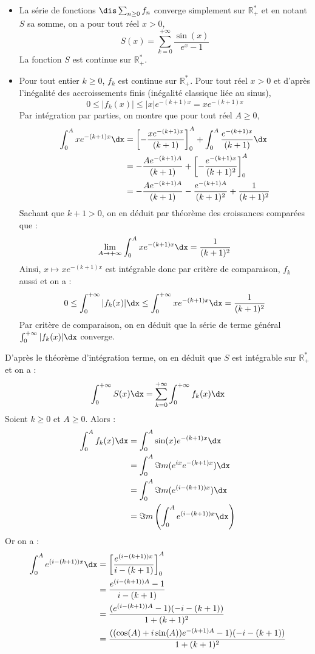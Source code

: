 \documentclass[a4paper,10pt]{report}
\begin{document}
\begin{itemize}
\item La série de fonctions $\dis \sum_{n \geq 0} f_n$ converge simplement sur $\mathbb{R}_+^*$ et en notant $S$ sa somme, on a pour tout réel $x>0$,
$$ S(x)= \sum_{k=0}^{+ \infty} \dfrac{\sin(x)}{e^x-1}$$
La fonction $S$ est continue sur $\mathbb{R}_+^*$.
\item Pour tout entier $k \geq 0$, $f_k$ est continue sur $\mathbb{R}_+^*$. Pour tout réel $x>0$ et d'après l'inégalité des accroissements finis (inégalité classique liée au sinus),
$$ 0 \leq \vert f_k(x) \vert \leq \vert x \vert e^{-(k+1)x} = x  e^{-(k+1)x}$$
Par intégration par parties, on montre que pour tout réel $A \geq 0$,
\begin{align*}
\int_0^{A} x e^{-(k+1)x} \dx & = \left[- \dfrac{xe^{-(k+1)x}}{(k+1)} \right]_0^A + \int_0^A \dfrac{e^{-(k+1)x}}{(k+1)} \dx \\
& = - \dfrac{Ae^{-(k+1)A}}{(k+1)} +  \left[- \dfrac{e^{-(k+1)x}}{(k+1)^2} \right]_0^A \\
& =  - \dfrac{Ae^{-(k+1)A}}{(k+1)} - \dfrac{e^{-(k+1)A}}{(k+1)^2} + \dfrac{1}{(k+1)^2}
\end{align*}
Sachant que $k+1>0$, on en déduit par théorème des croissances comparées que :
$$ \lim_{A \rightarrow + \infty} \int_0^{A} x e^{-(k+1)x} \dx = \dfrac{1}{(k+1)^2}$$
Ainsi, $x \mapsto x  e^{-(k+1)x}$ est intégrable donc par critère de comparaison, $f_k$ aussi et on a :
$$ 0 \leq \int_0^{+ \infty}\vert f_k(x) \vert \dx \leq  \int_0^{+ \infty} x  e^{-(k+1)x} \dx = \dfrac{1}{(k+1)^2}$$
Par critère de comparaison, on en déduit que la série de terme général $\int_0^{+ \infty}\vert f_k(x) \vert \dx$ converge.
\end{itemize}
D'après le théorème d'intégration terme, on en déduit que $S$ est intégrable sur $\mathbb{R}_+^*$ et on a :
$$ \int_0^{+ \infty} S(x) \dx = \sum_{k=0}^{+ \infty} \int_0^{+ \infty} f_k(x) \dx$$
Soient $k \geq 0$ et $A \geq 0$. Alors :
\begin{align*}
\int_0^A f_k(x) \dx &  = \int_0^A \sin(x) e^{-(k+1)x} \dx \\
& = \int_0^A \Im m(e^{ix}  e^{-(k+1)x}) \dx \\
& = \int_0^A \Im m(e^{(i-(k+1))x}) \dx \\
& = \Im m  \left(  \int_0^A e^{(i-(k+1))x} \dx \right) \\
\end{align*}
Or on a :
\begin{align*}
\int_0^A e^{(i-(k+1))x} \dx & = \left[ \dfrac{e^{(i-(k+1))x}}{i-(k+1)} \right]_0^A \\
& = \dfrac{e^{(i-(k+1))A} - 1}{i-(k+1)} \\
& = \dfrac{(e^{(i-(k+1))A} - 1)(-i-(k+1))}{1+(k+1)^2} \\
& = \dfrac{((\cos(A)+i \sin(A))e^{-(k+1)A} - 1)(-i-(k+1))}{1+(k+1)^2} 
\end{align*}
\end{document}
